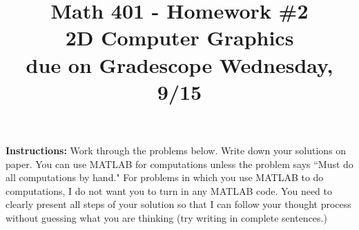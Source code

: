 \documentclass{article}
\begin{document}
\title{Math 401 - Homework \#2\\ 2D Computer Graphics\\ due on Gradescope Wednesday, 9/15}
\author{}
\date{}
\maketitle

\noindent \textbf{Instructions:} Work through the problems below.  Write down your solutions on paper.  You can use MATLAB for computations unless the problem says ``Must do all computations by hand."  For problems in which you use MATLAB to do computations, I do not want you to turn in any MATLAB code.  You need to clearly present all steps of your solution so that I can follow your thought process without guessing what you are thinking (try writing in complete sentences.)
\end{document}
